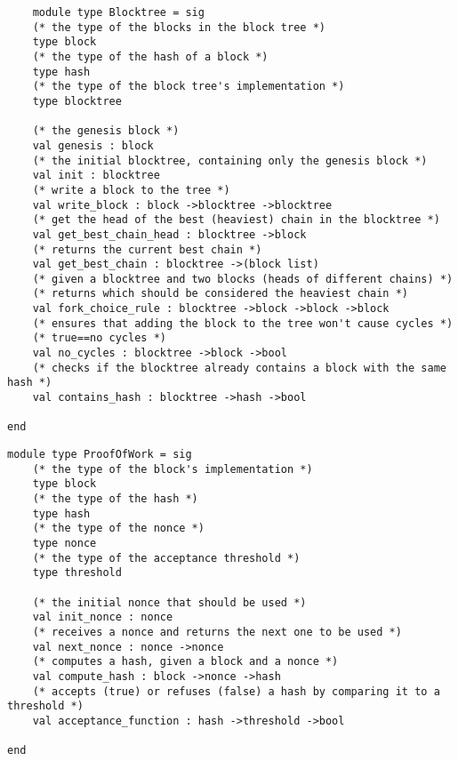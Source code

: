 \begin{lstlisting}
    module type Blocktree = sig
    (* the type of the blocks in the block tree *)
    type block
    (* the type of the hash of a block *)
    type hash
    (* the type of the block tree's implementation *)
    type blocktree
  
    (* the genesis block *)
    val genesis : block
    (* the initial blocktree, containing only the genesis block *)
    val init : blocktree
    (* write a block to the tree *)
    val write_block : block ->blocktree ->blocktree
    (* get the head of the best (heaviest) chain in the blocktree *)
    val get_best_chain_head : blocktree ->block
    (* returns the current best chain *)
    val get_best_chain : blocktree ->(block list)
    (* given a blocktree and two blocks (heads of different chains) *)
    (* returns which should be considered the heaviest chain *)
    val fork_choice_rule : blocktree ->block ->block ->block
    (* ensures that adding the block to the tree won't cause cycles *)
    (* true==no cycles *)
    val no_cycles : blocktree ->block ->bool
    (* checks if the blocktree already contains a block with the same hash *)
    val contains_hash : blocktree ->hash ->bool

end
\end{lstlisting}

\begin{lstlisting}
module type ProofOfWork = sig
    (* the type of the block's implementation *)
    type block
    (* the type of the hash *)
    type hash
    (* the type of the nonce *)
    type nonce
    (* the type of the acceptance threshold *)
    type threshold

    (* the initial nonce that should be used *)
    val init_nonce : nonce
    (* receives a nonce and returns the next one to be used *)
    val next_nonce : nonce ->nonce
    (* computes a hash, given a block and a nonce *)
    val compute_hash : block ->nonce ->hash
    (* accepts (true) or refuses (false) a hash by comparing it to a threshold *)
    val acceptance_function : hash ->threshold ->bool

end
\end{lstlisting}

